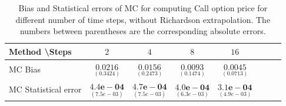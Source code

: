 \documentclass[11pt]{article}
\begin{document}
\begin{table}[h!]
	\centering
	\begin{tabular}{l*{6}{c}r}
		Method \textbackslash  Steps            & $2$ & $4$ & $8$ & $16$  \\
		\hline
		MC Bias   & 	$ \underset{(      0.3424 )}{\mathbf{0.0216}}$  & $\underset{(0.2473)}{\mathbf{ 0.0156
		}}$  & $\underset{(  0.1474)}{\mathbf{0.0093}}$ & $\underset{(     0.0713
	)}{\mathbf{  0.0045 }}$\\ 
		
		MC Statistical error     & 	$ \underset{( 7.5e-03  )}{\mathbf{4.4e-04}}$  & $\underset{(7.5e-03 )}{\mathbf{ 4.7e-04
		}}$  & $\underset{(6.3e-03 )}{\mathbf{4.0e-04}}$ & $\underset{( 4.9e-03 )}{\mathbf{ 3.1e-04  }}$\\ 
	
%		
		\hline
	\end{tabular}
	\caption{Bias and Statistical errors of MC  for computing Call option price  for different number of time steps, without Richardson extrapolation. The numbers between parentheses are the corresponding absolute errors.}
	\label{Bias and Statistical errors of MC  for computing Call option price  for different number of time steps, without Richardson extrapolation. The numbers between parentheses are the corresponding absolute errors.}
\end{table}
\end{document}
